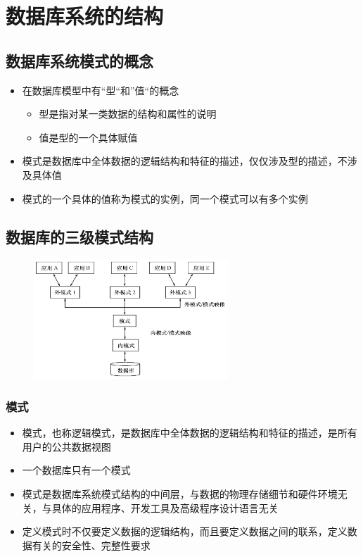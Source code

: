 \section{数据库系统的结构}

\subsection{数据库系统模式的概念}
\begin{itemize}
    \item 在数据库模型中有“型“和”值“的概念
    \begin{itemize}
        \item 型是指对某一类数据的结构和属性的说明
        \item 值是型的一个具体赋值
    \end{itemize}
    \item 模式是数据库中全体数据的逻辑结构和特征的描述，仅仅涉及型的描述，不涉及具体值
    \item 模式的一个具体的值称为模式的实例，同一个模式可以有多个实例
\end{itemize}

\subsection{数据库的三级模式结构}
\begin{figure}[H]
    \vspace{-0.5em}
	\centering
	\includegraphics[width=0.65\textwidth]{images/1.3.2}
    \vspace{-1em}
\end{figure}

\subsubsection{模式}
\begin{itemize}
    \item 模式，也称逻辑模式，是数据库中全体数据的逻辑结构和特征的描述，是所有用户的公共数据视图
    \item 一个数据库只有一个模式
    \item 模式是数据库系统模式结构的中间层，与数据的物理存储细节和硬件环境无关，与具体的应用程序、开发工具及高级程序设计语言无关
    \item 定义模式时不仅要定义数据的逻辑结构，而且要定义数据之间的联系，定义数据有关的安全性、完整性要求
\end{itemize}

